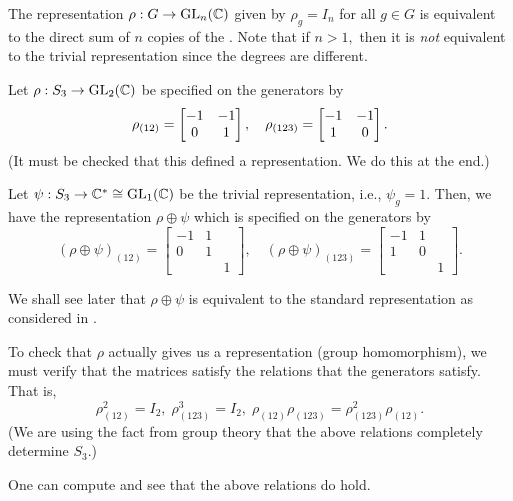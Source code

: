 \begin{ex} \label{ex:directsumoftrivialreps}
	The representation $\rho: G \to \operatorname{GL}_n(\mathbb{C})$ given by $\rho_g = I_n$ for all $g \in G$ is equivalent to the direct sum of $n$ copies of the . Note that if $n > 1,$ then it is \emph{not} equivalent to the trivial representation since the degrees are different.
\end{ex}

\begin{ex} \label{ex:S3GL2Crho}
	Let $\rho:S_3 \to \operatorname{GL}_2(\mathbb{C})$ be specified on the generators by
	\begin{equation*} 
		\rho_{(12)} = \begin{bmatrix} -1 & -1 \\ 0 & 1 \end{bmatrix}, \quad \rho_{(123)} = \begin{bmatrix} -1 & -1 \\ 1 & 0 \end{bmatrix}.
	\end{equation*}
	(It must be checked that this defined a representation. We do this at the end.) 

	Let $\psi:S_3 \to \mathbb{C}^* \cong \operatorname{GL}_1(\mathbb{C})$ be the trivial representation, i.e., $\psi_g = 1.$ Then, we have the representation $\rho \oplus \psi$ which is specified on the generators by
	\begin{equation*} 
		(\rho \oplus \psi)_{(12)} = \begin{bmatrix}
			-1 & 1 & \\
			0 & 1 & \\
			& & 1
		\end{bmatrix}, \quad (\rho \oplus \psi)_{(123)} = \begin{bmatrix}
			-1 & 1 & \\
			1 & 0 & \\
			& & 1
		\end{bmatrix}.
	\end{equation*}

	We shall see later that $\rho\oplus\psi$ is equivalent to the standard representation as considered in . %
	
	\hrulefill
	
	To check that $\rho$ actually gives us a representation (group homomorphism), we must verify that the matrices satisfy the relations that the generators satisfy. That is,
	\begin{equation*} 
		\rho_{(12)}^2 = I_2,\;\rho_{(123)}^3 = I_2,\; \rho_{(12)}\rho_{(123)} = \rho_{(123)}^2\rho_{(12)}.
	\end{equation*}
	(We are using the fact from group theory that the above relations completely determine $S_3.$)

	One can compute and see that the above relations do hold. %
\end{ex}

